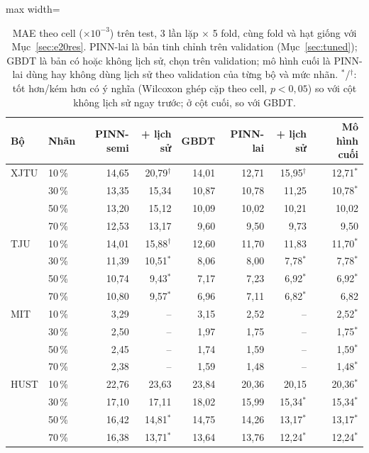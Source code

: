 \documentclass[12pt,a4paper,oneside]{report}
\theoremstyle{plain}
\theoremstyle{definition}
\begin{document}
\begin{table}[!htbp]\centering\footnotesize
\caption[MAE theo cell khi có và không có lịch sử]{MAE theo cell ($\times10^{-3}$) trên test, 3 lần lặp $\times$ 5 fold, cùng fold và hạt giống với Mục~\ref{sec:e20res}. PINN-lai là bản tinh chỉnh trên validation (Mục~\ref{sec:tuned}); GBDT là bản có hoặc không lịch sử, chọn trên validation; mô hình cuối là PINN-lai dùng hay không dùng lịch sử theo validation của từng bộ và mức nhãn. $^{*}$/$^{\dagger}$: tốt hơn/kém hơn có ý nghĩa (Wilcoxon ghép cặp theo cell, $p < 0{,}05$) so với cột không lịch sử ngay trước; ở cột cuối, so với GBDT.}\label{tab:e29}
\begin{adjustbox}{max width=\textwidth}\begin{tabular}{llrrrrrr}\toprule
Bộ & Nhãn & PINN-semi & + lịch sử & GBDT & PINN-lai & + lịch sử & Mô hình cuối \\\midrule
XJTU & 10\,\% & 14{,}65 & 20{,}79$^{\dagger}$ & 14{,}01 & 12{,}71 & 15{,}95$^{\dagger}$ & 12{,}71$^{*}$ \\
 & 30\,\% & 13{,}35 & 15{,}34 & 10{,}87 & 10{,}78 & 11{,}25 & 10{,}78$^{*}$ \\
 & 50\,\% & 13{,}20 & 15{,}12 & 10{,}09 & 10{,}02 & 10{,}21 & 10{,}02 \\
 & 70\,\% & 12{,}53 & 13{,}17 & 9{,}60 & 9{,}50 & 9{,}73 & 9{,}50 \\
TJU & 10\,\% & 14{,}01 & 15{,}88$^{\dagger}$ & 12{,}60 & 11{,}70 & 11{,}83 & 11{,}70$^{*}$ \\
 & 30\,\% & 11{,}39 & 10{,}51$^{*}$ & 8{,}06 & 8{,}00 & 7{,}78$^{*}$ & 7{,}78$^{*}$ \\
 & 50\,\% & 10{,}74 & 9{,}43$^{*}$ & 7{,}17 & 7{,}23 & 6{,}92$^{*}$ & 6{,}92$^{*}$ \\
 & 70\,\% & 10{,}80 & 9{,}57$^{*}$ & 6{,}96 & 7{,}11 & 6{,}82$^{*}$ & 6{,}82 \\
MIT & 10\,\% & 3{,}29 & -- & 3{,}15 & 2{,}52 & -- & 2{,}52$^{*}$ \\
 & 30\,\% & 2{,}50 & -- & 1{,}97 & 1{,}75 & -- & 1{,}75$^{*}$ \\
 & 50\,\% & 2{,}45 & -- & 1{,}74 & 1{,}59 & -- & 1{,}59$^{*}$ \\
 & 70\,\% & 2{,}38 & -- & 1{,}59 & 1{,}48 & -- & 1{,}48$^{*}$ \\
HUST & 10\,\% & 22{,}76 & 23{,}63 & 23{,}84 & 20{,}36 & 20{,}15 & 20{,}36$^{*}$ \\
 & 30\,\% & 17{,}10 & 17{,}11 & 18{,}02 & 15{,}99 & 15{,}34$^{*}$ & 15{,}34$^{*}$ \\
 & 50\,\% & 16{,}42 & 14{,}81$^{*}$ & 14{,}75 & 14{,}26 & 13{,}17$^{*}$ & 13{,}17$^{*}$ \\
 & 70\,\% & 16{,}38 & 13{,}71$^{*}$ & 13{,}64 & 13{,}76 & 12{,}24$^{*}$ & 12{,}24$^{*}$ \\
\bottomrule\end{tabular}\end{adjustbox}\end{table}
\end{document}
